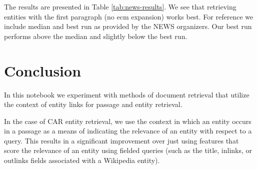 \documentclass{article}
\begin{document}
% 

The results are presented in Table \ref{tab:news-results}. We see that retrieving entities with the first paragraph (no ecm expansion) works best. For reference we include median and best run as provided by the NEWS organizers. Our best run performs above the median and slightly below the best run.









\section{Conclusion}
In this notebook we experiment with methods of document retrieval that  utilize the context of entity links for passage and entity retrieval.

In the case of CAR entity retrieval, we use the context in which an entity occurs in a passage as a means of indicating the relevance of an entity with respect to a query.
This results in a significant improvement over just using features that score the relevance of an entity using fielded queries (such as the title, inlinks, or outlinks fields associated with a Wikipedia entity).
\end{document}
